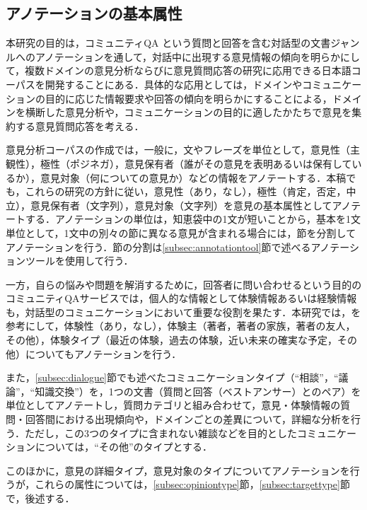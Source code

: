 \documentclass[japanese]{jnlp_1.4}
\begin{document}
\subsection{アノテーションの基本属性}
\label{subsec:basic}

本研究の目的は，コミュニティQA という質問と回答を含む対話型の文書ジャンルへのアノテーションを通して，対話中に出現する意見情報の傾向を明らかにして，複数ドメインの意見分析ならびに意見質問応答の研究に応用できる日本語コーパスを開発することにある．具体的な応用としては，ドメインやコミュニケーションの目的に応じた情報要求や回答の傾向を明らかにすることによる，ドメインを横断した意見分析や，コミュニケーションの目的に適したかたちで意見を集約する意見質問応答を考える．

意見分析コーパスの作成では，一般に，文やフレーズを単位として，意見性（主観性），極性（ポジネガ），意見保有者（誰がその意見を表明あるいは保有しているか），意見対象（何についての意見か）などの情報をアノテートする\cite{wiebe2005lre,seki2010ntcirov}．本稿でも，これらの研究の方針に従い，意見性（あり，なし），極性（肯定，否定，中立），意見保有者（文字列），意見対象（文字列）を意見の基本属性としてアノテートする．アノテーションの単位は，知恵袋中の1文が短いことから，基本を1文単位として，1文中の別々の節に異なる意見が含まれる場合には，節を分割してアノテーションを行う．節の分割は\ref{subsec:annotationtool}節で述べるアノテーションツールを使用して行う．

一方，自らの悩みや問題を解消するために，回答者に問い合わせるという目的のコミュニティQAサービスでは，個人的な情報として体験情報あるいは経験情報\cite{inui2008nlp,kurashima2008dews,seki2008wi2}も，対話型のコミュニケーションにおいて重要な役割を果たす．本研究では，を参考にして，体験性（あり，なし），体験主（著者，著者の家族，著者の友人，その他），体験タイプ（最近の体験，過去の体験，近い未来の確実な予定，その他）についてもアノテーションを行う．

また，\ref{subsec:dialogue}節でも述べたコミュニケーションタイプ\cite{adamic2008www,kabutoya2008dbsj}（``相談''，``議論''，``知識交換''）を，1つの文書（質問と回答（ベストアンサー）とのペア）を単位としてアノテートし，質問カテゴリと組み合わせて，意見・体験情報の質問・回答間における出現傾向や，ドメインごとの差異について，詳細な分析を行う．ただし，この3つのタイプに含まれない雑談などを目的としたコミュニケーションについては，``その他''のタイプとする．

このほかに，意見の詳細タイプ，意見対象のタイプについてアノテーションを行うが，これらの属性については，\ref{subsec:opiniontype}節，\ref{subsec:targettype}節で，後述する．
\end{document}
